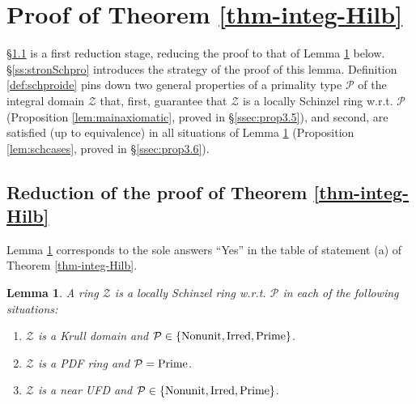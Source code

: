 \documentclass[11pt,a4paper,reqno]{amsart}
\newtheorem{lem}[thm]{Lemma}
\theoremstyle{definition}
\begin{document}
\section{Proof of Theorem \ref{thm-integ-Hilb}}
\label{sec:proof-main-lemma}
\S \ref{ssec:reduction} is a first reduction stage, reducing the proof to that of Lemma \ref{lem:main} below.  \S \ref{ss:stronSchpro} introduces the strategy of the proof of this lemma. Definition \ref{def:schproide} pins down two general properties of a primality type $\mathcal{P}$ of the integral domain ${\mathcal Z}$ that, first, guarantee that $\mathcal{Z}$ is a locally Schinzel ring \hbox{w.r.t.} $\mathcal{P}$ (Proposition \ref{lem:mainaxiomatic}, proved in \S \ref{ssec:prop3.5}), and second, are satisfied (up to equivalence) in all situations of Lemma \ref{lem:main} (Proposition \ref{lem:schcases}, proved in \S \ref{ssec:prop3.6}).


\subsection{Reduction of the proof of Theorem \ref{thm-integ-Hilb}} 
\label{ssec:reduction}
Lemma \ref{lem:main} corresponds to the sole answers ``Yes'' in the table of statement (a) of Theorem \ref{thm-integ-Hilb}. 

\begin{lem} \label{lem:main}
A ring $\mathcal{Z}$ is a locally Schinzel ring \hbox{w.r.t.} $\mathcal{P}$ in each of the following situations:
\begin{enumerate}
\item $\mathcal{Z}$ is a Krull domain and $\mathcal{P} \in \{{\rm Nonunit}, {\rm Irred}, {\rm Prime}\}$.
\item $\mathcal{Z}$ is a PDF ring and $\mathcal{P}={\rm Prime}$. \label{cond2lemmain}
\item $\mathcal{Z}$ is a near UFD and $\mathcal{P} \in \{{\rm Nonunit}, {\rm Irred}, {\rm Prime}\}$. \label{cond3lemmain}
\end{enumerate}
\end{lem}
\end{document}
